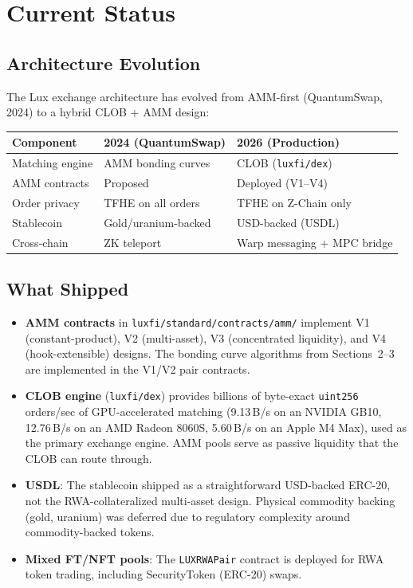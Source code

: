\section{Current Status}
\label{sec:current}

\subsection{Architecture Evolution}

The Lux exchange architecture has evolved from AMM-first
(QuantumSwap, 2024) to a hybrid CLOB + AMM design:

\begin{center}
\begin{tabular}{lll}
\toprule
\textbf{Component} & \textbf{2024 (QuantumSwap)} & \textbf{2026 (Production)} \\
\midrule
Matching engine & AMM bonding curves & CLOB (\texttt{luxfi/dex}) \\
AMM contracts & Proposed & Deployed (V1--V4) \\
Order privacy & TFHE on all orders & TFHE on Z-Chain only \\
Stablecoin & Gold/uranium-backed & USD-backed (USDL) \\
Cross-chain & ZK teleport & Warp messaging + MPC bridge \\
\bottomrule
\end{tabular}
\end{center}

\subsection{What Shipped}

\begin{itemize}[nosep]
  \item \textbf{AMM contracts} in \texttt{luxfi/standard/contracts/amm/}
        implement V1 (constant-product), V2 (multi-asset), V3
        (concentrated liquidity), and V4 (hook-extensible) designs.
        The bonding curve algorithms from Sections~2--3 are implemented
        in the V1/V2 pair contracts.
  \item \textbf{CLOB engine} (\texttt{luxfi/dex}) provides billions of
        byte-exact \texttt{uint256} orders/sec of GPU-accelerated matching
        (9.13\,B/s on an NVIDIA GB10, 12.76\,B/s on an AMD Radeon 8060S,
        5.60\,B/s on an Apple M4 Max), used as the primary exchange engine.
        AMM pools serve as passive liquidity that the CLOB can route
        through.
  \item \textbf{USDL}: The stablecoin shipped as a straightforward
        USD-backed ERC-20, not the RWA-collateralized multi-asset
        design. Physical commodity backing (gold, uranium) was deferred
        due to regulatory complexity around commodity-backed tokens.
  \item \textbf{Mixed FT/NFT pools}: The \texttt{LUXRWAPair} contract
        is deployed for RWA token trading, including SecurityToken
        (ERC-20) swaps.
\end{itemize}

